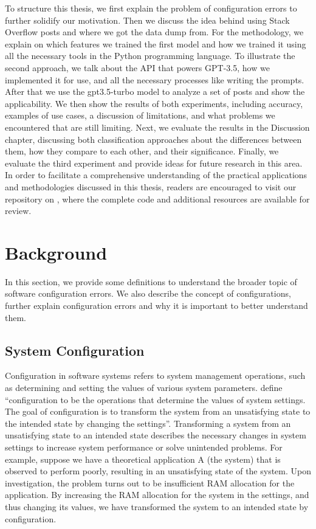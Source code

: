 \documentclass[english,bachelor]{swsLeipzig}
\begin{document}
To structure this thesis, we first explain the problem of configuration errors to further solidify our motivation. 
Then we discuss the idea behind using Stack Overflow posts and where we got the data dump from. For the methodology, 
we explain on which features we trained the first model and how we trained it using all the necessary tools in 
the Python programming language. To illustrate the second approach, we talk about the API that powers GPT-3.5, 
how we implemented it for use, and all the necessary processes like writing the prompts. After that we use 
the gpt3.5-turbo model to analyze a set of posts and show the applicability. We then show the results of both experiments, 
including accuracy, examples of use cases, a discussion of limitations, and what problems we encountered that 
are still limiting. Next, we evaluate the results in the Discussion chapter, discussing both classification 
approaches about the differences between them, how they compare to each other, and their significance. Finally, we 
evaluate the third experiment and provide ideas for future research in this area.\\

In order to facilitate a comprehensive understanding of the practical applications and methodologies discussed in this thesis, 
readers are encouraged to visit our repository on \citeauthor{repo}, where the complete code and additional resources are available for review.

\chapter{Background}\label{background}
In this section, we provide some definitions to understand the broader topic of software configuration errors. 
We also describe the concept of configurations, further explain configuration errors and why it is important to 
better understand them.

\section{System Configuration}\label{system_configuration}
Configuration in software systems refers to system management operations, such as determining and setting the values 
of various system parameters. \citet{xuzhou:2015} define ``configuration to be the operations that determine 
the values of system settings. The goal of configuration is to transform the system from an unsatisfying state to the 
intended state by changing the settings''. Transforming a system from an unsatisfying state to an intended state 
describes the necessary changes in system settings to increase system performance or solve unintended problems. 
For example, suppose we have a theoretical application A (the system) that is observed to perform poorly, resulting 
in an unsatisfying state of the system. Upon investigation, the problem turns out to be insufficient RAM allocation 
for the application. By increasing the RAM allocation for the system in the settings, and thus changing its values, 
we have transformed the system to an intended state by configuration. 
\end{document}
